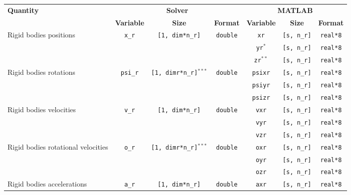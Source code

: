 {\footnotesize
\begin{tabular}{|l|c|c|c|c|c|c|}%
\hline
\multirow{2}{*}{\bf Quantity} & \multicolumn{3}{c|}{\bf Solver} &\multicolumn{3}{c|}{\bf MATLAB} \\ \cline{2-7}
& {\bf Variable} & {\bf Size} & {\bf Format} & {\bf Variable} & {\bf Size} & {\bf Format} \\ \hline
\multirow{3}{1in}{Rigid bodies positions} & \multirow{3}{*}{\texttt{x\_r}} & \multirow{3}{*}{\texttt{[1, dim*n\_r]}} & \multirow{3}{*}{\texttt{double}} & \texttt{xr} & \texttt{[s, n\_r]}& \texttt{real*8}\\ \cline{5-7}
& & & & \texttt{yr}$^*$ & \texttt{[s, n\_r]}& \texttt{real*8} \\ \cline{5-7}
& & & & \texttt{zr}$^{**}$ & \texttt{[s, n\_r]}& \texttt{real*8} \\ \hline
\multirow{3}{1in}{Rigid bodies rotations} & \multirow{3}{*}{\texttt{psi\_r}} & \multirow{3}{*}{\texttt{[1, dimr*n\_r]}$^{***}$} & \multirow{3}{*}{\texttt{double}} & \texttt{psixr} & \texttt{[s, n\_r]}& \texttt{real*8}\\ \cline{5-7}
& & & & \texttt{psiyr} & \texttt{[s, n\_r]}& \texttt{real*8} \\ \cline{5-7}
& & & & \texttt{psizr} & \texttt{[s, n\_r]}& \texttt{real*8} \\ \hline
\multirow{3}{1in}{Rigid bodies velocities} & \multirow{3}{*}{\texttt{v\_r}} & \multirow{3}{*}{\texttt{[1, dim*n\_r]}} & \multirow{3}{*}{\texttt{double}} & \texttt{vxr} & \texttt{[s, n\_r]}& \texttt{real*8}\\ \cline{5-7}
& & & & \texttt{vyr} & \texttt{[s, n\_r]}& \texttt{real*8} \\ \cline{5-7}
& & & & \texttt{vzr} & \texttt{[s, n\_r]}& \texttt{real*8} \\ \hline
\multirow{3}{1in}{Rigid bodies rotational velocities} & \multirow{3}{*}{\texttt{o\_r}} & \multirow{3}{*}{\texttt{[1, dimr*n\_r]}$^{***}$} & \multirow{3}{*}{\texttt{double}} & \texttt{oxr} & \texttt{[s, n\_r]}& \texttt{real*8}\\ \cline{5-7}
& & & & \texttt{oyr} & \texttt{[s, n\_r]}& \texttt{real*8} \\ \cline{5-7}
& & & & \texttt{ozr} & \texttt{[s, n\_r]}& \texttt{real*8} \\ \hline
\multirow{3}{1in}{Rigid bodies accelerations} & \multirow{3}{*}{\texttt{a\_r}} & \multirow{3}{*}{\texttt{[1, dim*n\_r]}} & \multirow{3}{*}{\texttt{double}} & \texttt{axr} & \texttt{[s, n\_r]}& \texttt{real*8}\\ \cline{5-7}

\end{tabular}}
